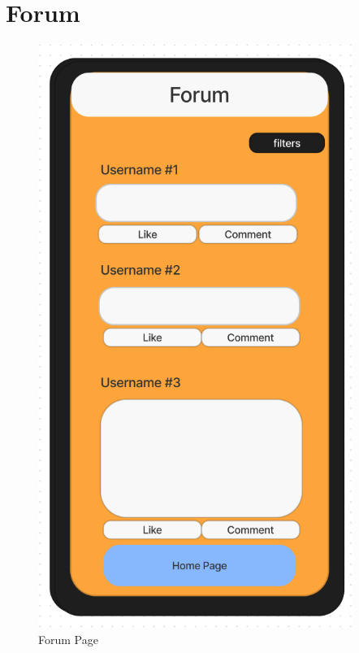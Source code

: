 \documentclass[title page]{article}
\begin{document}
\section{Forum}
\begin{figure}[!h]
    \begin{center}
          \includegraphics[height=19cm]{forum.png}
          \caption{Forum Page}
          \label{fig:forum}
    \end{center}
\end{figure}
\end{document}
